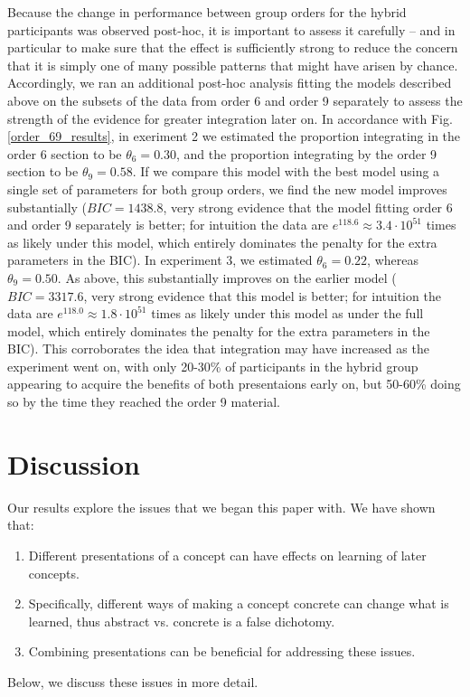 \documentclass[man,10pt]{apa6}
\begin{document}
Because the change in performance between group orders for the hybrid participants was observed post-hoc, it is important to assess it carefully -- and in particular to make sure that the effect is sufficiently strong to reduce the concern that it is simply one of many possible patterns that might have arisen by chance. Accordingly, we ran an additional post-hoc analysis fitting the models described above on the subsets of the data from order 6 and order 9 separately to assess the strength of the evidence for greater integration later on. In accordance with Fig. \ref{order_69_results}, in exeriment 2 we estimated the proportion integrating in the order 6 section to be $\theta_6 = 0.30$, and the proportion integrating by the order 9 section to be $\theta_9 = 0.58$. If we compare this model with the best model using a single set of parameters for both group orders, we find the new model improves substantially ($BIC = 1438.8$, very strong evidence that the model fitting order 6 and order 9 separately is better; for intuition the data are $e^{118.6} \approx 3.4 \cdot 10^{51}$ times as likely under this model, which entirely dominates the penalty for the extra parameters in the BIC). In experiment 3, we estimated $\theta_6 = 0.22$, whereas $\theta_9 = 0.50$. As above, this substantially improves on the earlier model ($BIC=3317.6$, very strong evidence that this model is better; for intuition the data are $e^{118.0} \approx 1.8 \cdot 10^{51}$ times as likely under this model as under the full model, which entirely dominates the penalty for the extra parameters in the BIC). This corroborates the idea that integration may have increased as the experiment went on, with only 20-30\% of participants in the hybrid group appearing to acquire the benefits of both presentaions early on, but 50-60\% doing so by the time they reached the order 9 material.
\section{Discussion}
Our results explore the issues that we began this paper with. We have shown that:
\begin{enumerate}
\item Different presentations of a concept can have effects on learning of later concepts.
\item Specifically, different ways of making a concept concrete can change what is learned, thus abstract vs. concrete is a false dichotomy.
\item Combining presentations can be beneficial for addressing these issues. 
\end{enumerate}
Below, we discuss these issues in more detail.
\end{document}
